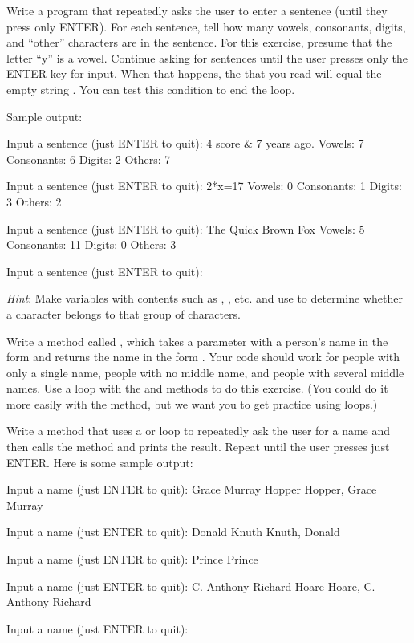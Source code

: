 \begin{exercise}
Write a program that repeatedly asks the user to enter a sentence (until they press only ENTER). For each sentence, tell how many vowels, consonants, digits, and ``other'' characters are in the sentence.  For this exercise, presume that the letter ``y'' is a vowel. Continue asking for sentences until the user presses only the ENTER key for input. When that happens, the  that you read will equal the empty string . You can test this condition to end the loop.

Sample output:

\begin{stdout}
Input a sentence (just ENTER to quit): 4 score & 7 years ago.
Vowels:   7  Consonants:  6
Digits:   2  Others:      7

Input a sentence (just ENTER to quit): 2*x=17
Vowels:   0  Consonants:  1
Digits:   3  Others:      2

Input a sentence (just ENTER to quit): The Quick Brown Fox
Vowels:   5  Consonants: 11
Digits:   0  Others:      3

Input a sentence (just ENTER to quit):
\end{stdout}

{\em Hint}: Make  variables with contents such as , , etc. and use  to determine whether a character belongs to that group of characters.

\end{exercise}

\begin{exercise}
Write a method called , which takes a  parameter with a person's name in the form  and returns the name in the form .  Your code should work for people with only a single name, people with no middle name, and people with several middle names.
Use a  loop with the  and  methods to do this exercise. (You could do it more easily with the  method, but we want you to get practice using loops.)

Write a  method that uses a  or  loop to repeatedly ask the user for a name and then calls the  method and prints the result. Repeat until the user presses just ENTER. Here is some sample output:

\begin{stdout}
Input a name (just ENTER to quit): Grace Murray Hopper
Hopper, Grace Murray

Input a name (just ENTER to quit): Donald Knuth   
Knuth, Donald

Input a name (just ENTER to quit): Prince
Prince

Input a name (just ENTER to quit): C. Anthony Richard Hoare
Hoare, C. Anthony Richard

Input a name (just ENTER to quit): 
\end{stdout}

\end{exercise}

